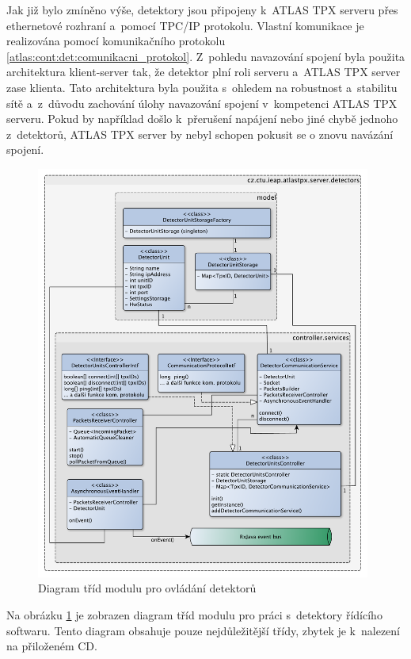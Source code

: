 Jak již bylo zmíněno výše, detektory jsou připojeny k~ATLAS TPX serveru přes ethernetové rozhraní a~pomocí TPC/IP protokolu. Vlastní komunikace je realizována pomocí komunikačního protokolu \ref{atlas:cont:det:comunikacni_protokol}. Z~pohledu navazování spojení byla použita architektura klient-server tak, že detektor plní roli serveru a~ATLAS TPX server zase klienta. Tato architektura byla použita s~ohledem na robustnost a~stabilitu sítě a~z~důvodu zachování úlohy navazování spojení v~kompetenci ATLAS TPX serveru. Pokud by například došlo k~přerušení napájení nebo jiné chybě jednoho z~detektorů, ATLAS TPX server by nebyl schopen pokusit se o znovu navázání spojení.

\begin{figure}[th]
	\begin{center}
		\includegraphics[width=11cm]{figures/atlas_tpx_detectors_class.pdf}
		\caption{Diagram tříd modulu pro ovládání detektorů}
		\label{fig:class:detectors}
	\end{center}
\end{figure}

Na obrázku \ref{fig:class:detectors} je zobrazen diagram tříd modulu pro práci s~detektory řídícího softwaru. Tento diagram obsahuje pouze nejdůležitější třídy, zbytek je k~nalezení na přiloženém CD.

